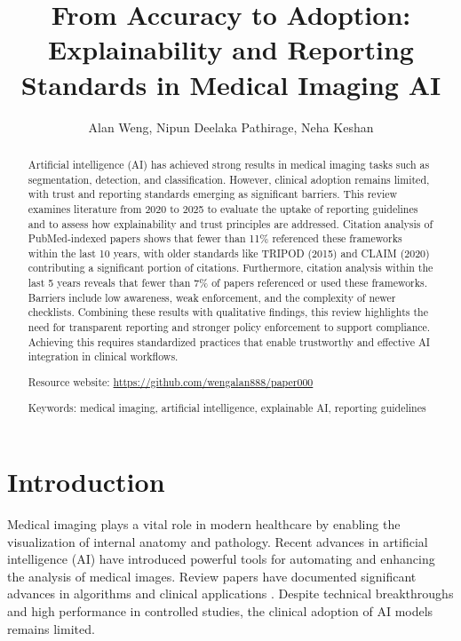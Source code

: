 \documentclass{article}
\title{From Accuracy to Adoption: Explainability and Reporting Standards in Medical Imaging AI}
\author{Alan Weng, Nipun Deelaka Pathirage, Neha Keshan}
\begin{document}
\maketitle

\begin{abstract}
Artificial intelligence (AI) has achieved strong results in medical imaging tasks such as segmentation, detection, and classification. However, clinical adoption remains limited, with trust and reporting standards emerging as significant barriers. This review examines literature from 2020 to 2025 to evaluate the uptake of reporting guidelines and to assess how explainability and trust principles are addressed. Citation analysis of PubMed-indexed papers shows that fewer than 11\% referenced these frameworks within the last 10 years, with older standards like TRIPOD (2015) and CLAIM (2020) contributing a significant portion of citations. Furthermore, citation analysis within the last 5 years reveals that fewer than 7\% of papers referenced or used these frameworks. Barriers include low awareness, weak enforcement, and the complexity of newer checklists. Combining these results with qualitative findings, this review highlights the need for transparent reporting and stronger policy enforcement to support compliance. Achieving this requires standardized practices that enable trustworthy and effective AI integration in clinical workflows.


Resource website: \hyperlink{https://github.com/wengalan888/paper000}{https://github.com/wengalan888/paper000}


Keywords: medical imaging, artificial intelligence, explainable AI, reporting guidelines

\end{abstract}

\section{Introduction}
Medical imaging plays a vital role in modern healthcare by enabling the visualization of internal anatomy and pathology. Recent advances in artificial intelligence (AI) have introduced powerful tools for automating and enhancing the analysis of medical images. Review papers have documented significant advances in algorithms and clinical applications \cite{panayides_2020_ai,tang_2019_the,zakaria_2024_advancements}. Despite technical breakthroughs and high performance in controlled studies, the clinical adoption of AI models remains limited. 
\end{document}
